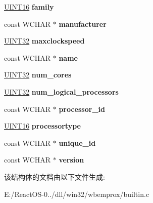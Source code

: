 \begin{DoxyCompactItemize}
\hyperlink{_processor_bind_8h_a09f1a1fb2293e33483cc8d44aefb1eb1}{U\+I\+N\+T16} {\bfseries family}
\item 
\mbox{\label{structrecord__processor_af12f993a0555d78b9359af51a005e2c6}} 
const W\+C\+H\+AR $\ast$ {\bfseries manufacturer}
\item 
\mbox{\label{structrecord__processor_a8f7817df10b9bdae00541b3c6acbdc74}} 
\hyperlink{_processor_bind_8h_ae1e6edbbc26d6fbc71a90190d0266018}{U\+I\+N\+T32} {\bfseries maxclockspeed}
\item 
\mbox{\label{structrecord__processor_a55ff4d23fab19495c51b5d40fdf9e504}} 
const W\+C\+H\+AR $\ast$ {\bfseries name}
\item 
\mbox{\label{structrecord__processor_acf48e4b08c91936816a598377322640d}} 
\hyperlink{_processor_bind_8h_ae1e6edbbc26d6fbc71a90190d0266018}{U\+I\+N\+T32} {\bfseries num\+\_\+cores}
\item 
\mbox{\label{structrecord__processor_a8bd3c550c868b166035ad2b3bba9c7f3}} 
\hyperlink{_processor_bind_8h_ae1e6edbbc26d6fbc71a90190d0266018}{U\+I\+N\+T32} {\bfseries num\+\_\+logical\+\_\+processors}
\item 
\mbox{\label{structrecord__processor_a9dbec14e8690d605b8b2ccc0137613b2}} 
const W\+C\+H\+AR $\ast$ {\bfseries processor\+\_\+id}
\item 
\mbox{\label{structrecord__processor_a1a74cd38ead2be23fe8cb476a2ac4ff2}} 
\hyperlink{_processor_bind_8h_a09f1a1fb2293e33483cc8d44aefb1eb1}{U\+I\+N\+T16} {\bfseries processortype}
\item 
\mbox{\label{structrecord__processor_ae87ddabfa5cde6a2756e7ae7b8e406ec}} 
const W\+C\+H\+AR $\ast$ {\bfseries unique\+\_\+id}
\item 
\mbox{\label{structrecord__processor_ae85c3f1b6df7c8549c19900eecbf8a63}} 
const W\+C\+H\+AR $\ast$ {\bfseries version}
\end{DoxyCompactItemize}


该结构体的文档由以下文件生成\+:\begin{DoxyCompactItemize}
\item 
E\+:/\+React\+O\+S-\/0../dll/win32/wbemprox/builtin.\+c\end{DoxyCompactItemize}
